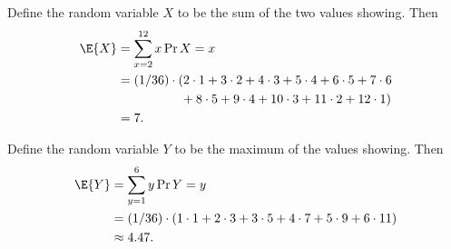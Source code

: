Define the random variable $X$ to be the sum of the two values showing.
Then
\begin{align*}
    \E{X} &= \sum_{x=2}^{12}x\Pr{X=x} \\
    &= (1/36)\cdot(2\cdot1+3\cdot2+4\cdot3+5\cdot4+6\cdot5+7\cdot6 \\
    &\quad\quad\quad\quad\quad {}+8\cdot5+9\cdot4+10\cdot3+11\cdot2+12\cdot1) \\
    &= 7.
\end{align*}

Define the random variable $Y$ to be the maximum of the values showing.
Then
\begin{align*}
    \E{Y} &= \sum_{y=1}^{6}y\Pr{Y=y} \\
    &= (1/36)\cdot(1\cdot1+2\cdot3+3\cdot5+4\cdot7+5\cdot9+6\cdot11) \\
    &\approx 4.47.
\end{align*}
